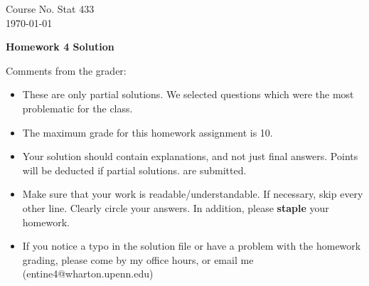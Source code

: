 \documentclass[10pt,a4paper]{article}
\begin{document}
\begin{flushleft}
Course No. Stat 433 \\
\today
\end{flushleft}

\begin{center}
{\Large{\bf  Homework 4 Solution}}
\end{center}

\textcolor[rgb]{0.98,0.00,0.00}{Comments from the grader:}
\begin{itemize}
    \item \textcolor[rgb]{0.98,0.00,0.00}{These are only partial solutions.  We selected
    questions which were the most problematic for the class.}
    \item \textcolor[rgb]{0.98,0.00,0.00}{The maximum grade for this homework assignment is 10.}
    \item \textcolor[rgb]{0.98,0.00,0.00}{Your solution should contain explanations, and not just
    final answers. Points will be deducted if partial solutions.
    are submitted.}
    \item \textcolor[rgb]{0.98,0.00,0.00}{Make sure that your work is readable/understandable.  If necessary, skip every other line.  Clearly circle your answers.  In addition, please {\bf staple} your homework.}
    \item \textcolor[rgb]{0.98,0.00,0.00}{If you notice a typo in the solution file or have a problem with the homework
    grading, please come by my office hours, or email me (entine4@wharton.upenn.edu)}

\end{itemize}
\end{document}
